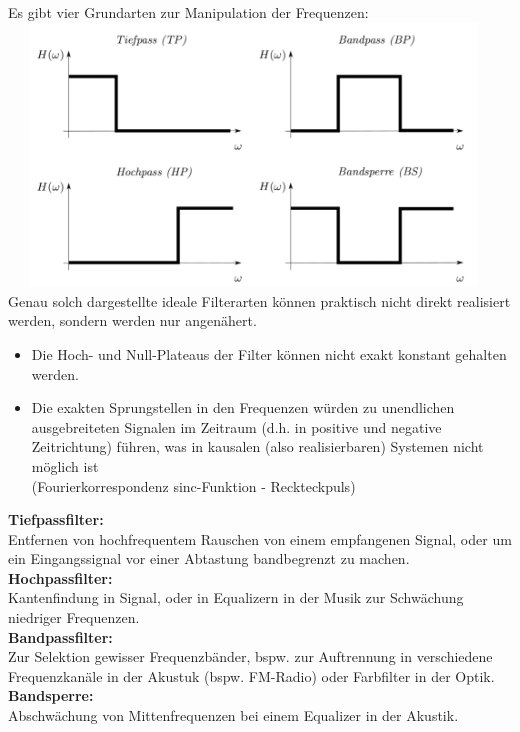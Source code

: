 \documentclass[12pt,a4paper]{scrartcl}
\begin{document}
    \noindent Es gibt vier Grundarten zur Manipulation der Frequenzen:\\
    \includegraphics[height=7cm,width=13cm]{Pictures/Filter.png} \\
    \noindent Genau solch dargestellte ideale Filterarten können praktisch nicht direkt realisiert werden, sondern werden nur angenähert.
    \begin{itemize}
      \item Die Hoch- und Null-Plateaus der Filter können nicht exakt konstant gehalten werden. 
      \item Die exakten Sprungstellen in den Frequenzen würden zu unendlichen ausgebreiteten Signalen im Zeitraum 
      (d.h. in positive und negative Zeitrichtung) führen, 
      was in kausalen (also realisierbaren) Systemen nicht möglich ist \\
      (Fourierkorrespondenz sinc-Funktion - Reckteckpuls)\\
    \end{itemize}

    \noindent \textbf{Tiefpassfilter:}\\
    Entfernen von hochfrequentem Rauschen von einem empfangenen Signal, oder um ein Eingangssignal vor einer Abtastung bandbegrenzt zu machen.\\
    \noindent \textbf{Hochpassfilter:}\\ 
    Kantenfindung in Signal, oder in Equalizern in der Musik zur Schwächung niedriger Frequenzen.\\
    \noindent \textbf{Bandpassfilter:}\\
    Zur Selektion gewisser Frequenzbänder, bspw. zur Auftrennung in verschiedene Frequenzkanäle in der Akustuk (bspw. FM-Radio) oder Farbfilter in der Optik. \\
    \noindent \textbf{Bandsperre:}\\
    Abschwächung von Mittenfrequenzen bei einem Equalizer in der Akustik. 
\end{document}
